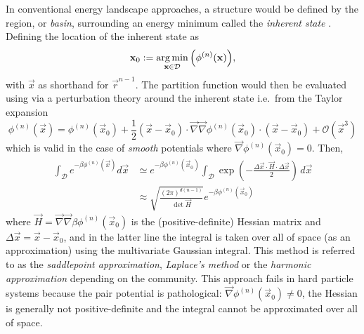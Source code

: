 \documentclass[11pt,twoside]{report}
\begin{document}
In conventional energy landscape approaches, a structure%
would be defined by the region, or \emph{basin}, surrounding an energy minimum called the \emph{inherent state} \cite{StillingerPRA1982,StillingerS1995,Wales2004}.
Defining the location of the inherent state as
\begin{equation*}
  \boldsymbol{\mathbf{x}}_0
  :=
  \operatorname*{arg\,min}_{\boldsymbol{\mathbf{x}} \in \mathcal{D}}{\left( \phi^{(n)}(\boldsymbol{\mathbf{x}}) \right)},
\end{equation*}
with $\vec{x}$ as shorthand for $\vec{r}^{n-1}$.
The partition function would then be evaluated using via a perturbation theory around the inherent state i.e.\ from the Taylor expansion \cite{Wales2004}
\begin{equation*}
  \phi^{(n)}(\vec{x})
  =
  \phi^{(n)}(\vec{x}_0)
  + \frac{1}{2} (\vec{x} - \vec{x}_0) \cdot
  \vec{\nabla}\vec{\nabla} \phi^{(n)}(\vec{x}_0)
  \cdot (\vec{x} - \vec{x}_0)
  + \mathcal{O}(\vec{x}^3)
\end{equation*}
which is valid in the case of \emph{smooth} potentials where $\vec{\nabla} \phi^{(n)}(\vec{x}_0) = 0$.
Then, \cite{Wales2004}
\begin{equation}\label{eq:harmonic-approximation}
  \begin{split}
    \int_\mathcal{D} e^{-\beta\phi^{(n)}(\vec{x})} d\vec{x}
    &\simeq
    e^{-\beta\phi^{(n)}(\vec{x}_0)}
    \int_\mathcal{D}
    \exp{\left( - \frac{\Delta\vec{x} \cdot \vec{H} \cdot \Delta\vec{x}}{2} \right)}
    \, d\vec{x}
    \\ &\approx
    \sqrt{ \frac{(2\pi)^{d(n-1)}}{\det \vec{H}} }
    e^{-\beta\phi^{(n)}(\vec{x}_0)}
  \end{split}
\end{equation}
where $\vec{H} = \vec{\nabla}\vec{\nabla} \beta \phi^{(n)}(\vec{x}_0)$ is the (positive-definite) Hessian matrix and $\Delta \vec{x} = \vec{x} - \vec{x}_0$, and in the latter line the integral is taken over all of space (as an approximation) using the multivariate Gaussian integral.
This method is referred to as the \emph{saddlepoint approximation}, \emph{Laplace's method} or the \emph{harmonic approximation} depending on the community.
This approach fails in hard particle systems because the pair potential is pathological: $\vec{\nabla} \phi^{(n)}(\vec{x}_0) \ne 0$, the Hessian is generally not positive-definite and the integral cannot be approximated over all of space.
\end{document}
